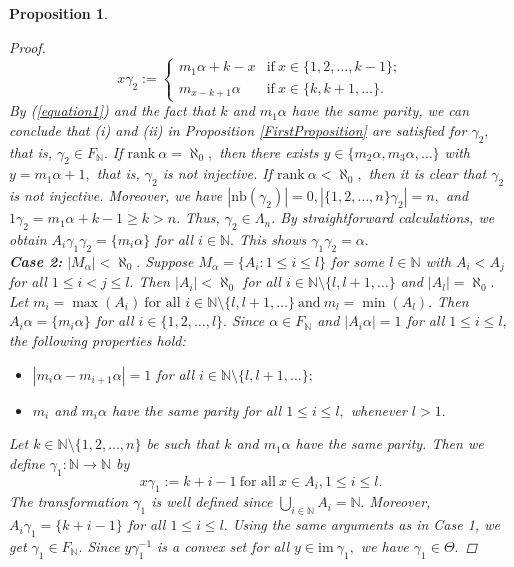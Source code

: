 \documentclass[11pt]{article}
\theoremstyle{plain}
\newtheorem{proposition}[theorem]{Proposition}
\theoremstyle{definition}
\newcommand{\rank}{\mathrm{rank~}}
\newcommand{\im}{\mathrm{im~}}
\newcommand{\nb}{\mathrm{nb}}
\begin{document}
\begin{proposition}
\begin{proof}
$$x\gamma_{2}:=\begin{cases}
m_{1}\alpha+k-x&\text{if}~x\in\{1,2,\ldots,k-1\};\\
m_{x-k+1}\alpha~~&\text{if}~x\in\{k,k+1,\ldots\}.
\end{cases}$$
By (\ref{equation1}) and the fact that $k$ and $m_{1}\alpha$ have the same parity, we can conclude that (i) and (ii) in Proposition \ref{FirstProposition} are satisfied for $\gamma_{2},$ that is, $\gamma_{2}\in F_{\mathbb{N}}.$ If $\rank\alpha=\aleph_{0},$ then there exists $y\in\{m_{2}\alpha,m_{3}\alpha,\ldots\}$ with $y=m_{1}\alpha+1,$ that is, $\gamma_{2}$ is not injective. If $\rank\alpha<\aleph_{0},$ then it is clear that $\gamma_{2}$ is not injective. Moreover, we have $\left\vert\nb(\gamma_{2})\right\vert=0, \left\vert\{1,2,\ldots,n\}\gamma_{2}\right\vert=n,$ and $1\gamma_{2}=m_{1}\alpha+k-1\geq k> n.$ Thus, $\gamma_{2}\in\Lambda_{n}.$ By straightforward calculations, we obtain $A_{i}\gamma_{1}\gamma_{2}=\{m_{i}\alpha\}$ for all $i\in\mathbb{N}.$ This shows $\gamma_{1}\gamma_{2}=\alpha.$\\
$~$\\
\textbf{Case 2:} $\left\vert M_{\alpha}\right\vert<\aleph_{0}.$ Suppose $M_{\alpha}=\{A_{i}:1\leq i\leq l\}$ for some $l\in\mathbb{N}$ with $A_{i}<A_{j}$ for all $1\leq i<j\leq l.$ Then $\left\vert A_{i}\right\vert<\aleph_{0}$ for all $i\in\mathbb{N}\setminus\{l,l+1,\ldots\}$ and $\left\vert A_{l}\right\vert=\aleph_{0}.$ Let $m_{i}=\max(A_{i})~\text{for all }i\in\mathbb{N}\setminus\{l,l+1,\ldots\}~\text{and}~m_{l}=\min(A_{l}).$
Then $A_{i}\alpha=\{m_{i}\alpha\}$ for all $i\in\{1,2,\ldots,l\}.$ Since $\alpha\in F_{\mathbb{N}}$ and $\left\vert A_{i}\alpha\right\vert=1$ for all $1\leq i\leq l,$ the following properties hold:
\begin{itemize}
\item[(a1)] $\left\vert m_{i}\alpha-m_{i+1}\alpha\right\vert=1$ for all $i\in\mathbb{N}\setminus\{l,l+1,\ldots\};$
\item[(a2)] $m_{i}$ and $m_{i}\alpha$ have the same parity for all $1\leq i\leq l,$ whenever $l>1.$
\end{itemize}
Let $k\in\mathbb{N}\setminus\{1,2,\ldots,n\}$ be such that $k$ and $m_{1}\alpha$ have the same parity. Then we define $\gamma_{1}:\mathbb{N}\to\mathbb{N}$ by $$x\gamma_{1}:=k+i-1~\text{for all}~x\in A_{i},1\leq i\leq l.$$
The transformation $\gamma_{1}$ is well defined since $\bigcup_{i\in \mathbb{N}}A_{i}=\mathbb{N}.$ Moreover, $A_{i}\gamma_{1}=\{k+i-1\}$ for all $1\leq i\leq l.$ Using the same arguments as in Case 1, we get $\gamma_{1}\in F_{\mathbb{N}}.$ Since $y\gamma_{1}^{-1}$ is a convex set for all $y\in\im\gamma_{1},$ we have $\gamma_{1}\in\Theta.$ 

\end{proof}
\end{proposition}
\end{document}
